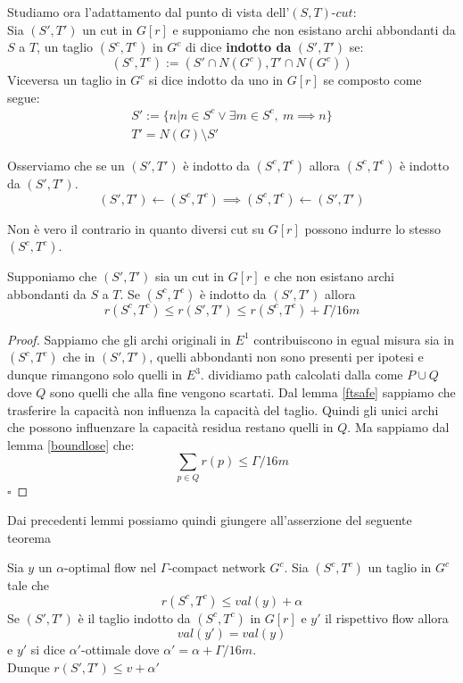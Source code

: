 \documentclass[a4paper, 11pt]{report}
\newcommand*{\QED}{\null\nobreak\hfill\ensuremath{\square}}%
\newcommand{\gmm}{$\Gamma$}
\begin{document}
Studiamo ora l'adattamento dal punto di vista dell'$(S,T)$-$cut$:\\
Sia $(S',T')$ un cut in $G[r]$ e supponiamo che non esistano archi abbondanti da $S$ a $T$,
un taglio $(S^c,T^c)$ in $G^c$ di dice \textbf{indotto da}  $(S',T')$ se: \[(S^c, T^c) := (S'\cap N(G^c), T'\cap N(G^c))\]
Viceversa un taglio in $G^c$ si dice indotto da uno in $G[r]$ se composto come segue:
\[\begin{array}{l}
    S':=\{n | n\in S^c\lor \exists m \in S^c,\ m \implies n\}\\
    T' = N(G)\setminus S'
\end{array}\]

\begin{obs}{}{}
    Osserviamo che se un $(S',T')$ è indotto da  $(S^c,T^c)$ allora  $(S^c,T^c)$ è indotto da $(S',T')$.
        \[(S',T')\leftarrow(S^c,T^c)\implies (S^c,T^c)\leftarrow(S',T')\]

    Non è vero il contrario in quanto diversi cut su $G[r]$ possono indurre lo stesso $(S^c,T^c)$.
\end{obs}

\begin{lemma}{}{}
    Supponiamo che $(S',T')$ sia un cut in $G[r]$ e che non esistano archi abbondanti da $S$ a $T$.
    Se $(S^c,T^c)$ è indotto da $(S',T')$ allora \[ r(S^c,T^c) \le r(S',T')\le r(S^c,T^c)+\Gamma/16m\]
\end{lemma}
\begin{proof}
    Sappiamo che gli archi originali in $E^1$ contribuiscono in egual misura sia in $(S^c,T^c)$ che in $(S',T')$, quelli abbondanti non sono presenti per ipotesi e dunque rimangono solo quelli in $E^3$.
    dividiamo path calcolati dalla  come $P\cup Q$ dove $Q$ sono quelli che alla fine vengono scartati.
    Dal lemma \ref{ftsafe} sappiamo che trasferire la capacità non influenza la capacità del taglio. Quindi gli unici archi che possono influenzare la capacità residua restano quelli in $Q$.
    Ma sappiamo dal lemma \ref{boundlose} che:
    \[\sum_{p\in Q}r(p)\le \Gamma/16m\]\QED
\end{proof}
Dai precedenti lemmi possiamo quindi giungere all'asserzione del seguente teorema
\begin{theo}{}{}
    Sia $y$ un $\alpha$-optimal flow nel \gmm-compact network $G^c$.
    Sia $(S^c,T^c)$ un taglio in $G^c$ tale che \[r(S^c,T^c)\le val(y)+\alpha\] 
    Se $(S',T')$ è il taglio indotto da $(S^c,T^c)$ in $G[r]$ e $y'$ il rispettivo flow allora
    \[val(y') = val(y)\]
    e $y'$ si dice $\alpha'$-ottimale dove $\alpha' = \alpha + \Gamma/16m$.\\
    Dunque $r(S',T') \le v+\alpha'$
\end{theo}
\end{document}
